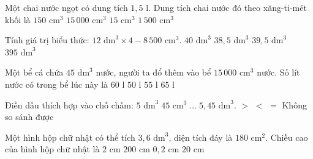 \begin{ex} %
Một chai nước ngọt có dung tích $1{,}5\text{ l}$. Dung tích chai nước đó theo xăng-ti-mét khối là
\choice
{$150\text{ cm}^3$}
{$15\,000\text{ cm}^3$}
{$15\text{ cm}^3$}
{\True $1\,500\text{ cm}^3$}
\end{ex}

\begin{ex} %
Tính giá trị biểu thức: $12\text{ dm}^3 \times 4 - 8\,500\text{ cm}^3$.
\choice
{$40\text{ dm}^3$}
{$38{,}5\text{ dm}^3$}
{\True $39{,}5\text{ dm}^3$}
{$395\text{ dm}^3$}
\end{ex}

\begin{ex} %
Một bể cá chứa $45\text{ dm}^3$ nước, người ta đổ thêm vào bể $15\,000\text{ cm}^3$ nước. Số lít nước có trong bể lúc này là
\choice
{\True $60\text{ l}$}
{$50\text{ l}$}
{$55\text{ l}$}
{$65\text{ l}$}
\end{ex}

\begin{ex} %
Điền dấu thích hợp vào chỗ chấm: $5\text{ dm}^3\; 45\text{ cm}^3 \;\dots\; 5{,}45\text{ dm}^3$.
\choice
{$>$}
{\True $<$}
{$=$}
{Không so sánh được}
\end{ex}

\begin{ex} %
Một hình hộp chữ nhật có thể tích $3{,}6\text{ dm}^3$, diện tích đáy là $180\text{ cm}^2$. Chiều cao của hình hộp chữ nhật là
\choice
{$2\text{ cm}$}
{$200\text{ cm}$}
{$0{,}2\text{ cm}$}
{\True $20\text{ cm}$}
\end{ex}

